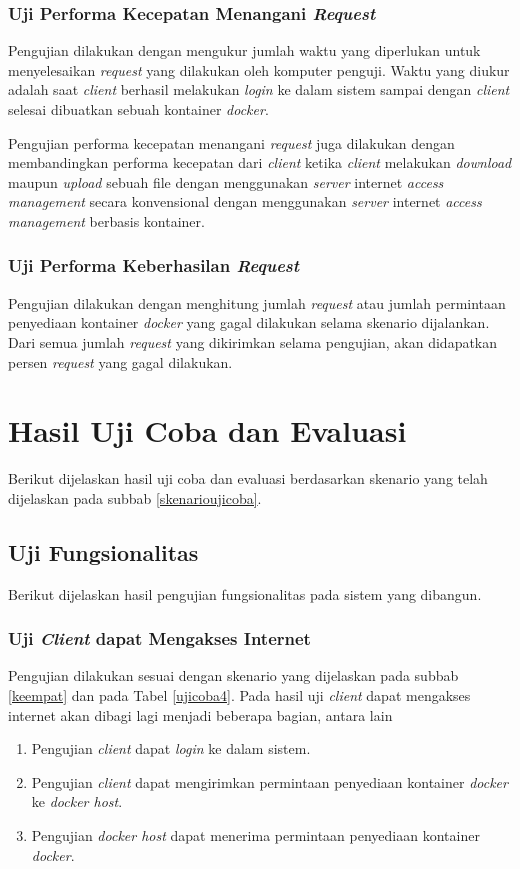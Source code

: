 \subsubsection{Uji Performa Kecepatan Menangani \textit{Request}}
Pengujian dilakukan dengan mengukur jumlah waktu yang diperlukan untuk menyelesaikan \textit{request} yang dilakukan oleh komputer penguji. Waktu yang diukur adalah saat \textit{client} berhasil melakukan \textit{login} ke dalam sistem sampai dengan \textit{client} selesai dibuatkan sebuah kontainer \textit{docker}.

Pengujian performa kecepatan menangani \textit{request} juga dilakukan dengan membandingkan performa kecepatan dari \textit{client} ketika \textit{client} melakukan \textit{download} maupun \textit{upload} sebuah file dengan menggunakan \textit{server} internet \textit{access management} secara konvensional dengan menggunakan \textit{server} internet \textit{access management} berbasis kontainer.

\subsubsection{Uji Performa Keberhasilan \textit{Request}}
Pengujian dilakukan dengan menghitung jumlah \textit{request} atau jumlah permintaan penyediaan kontainer \textit{docker} yang gagal dilakukan selama skenario dijalankan. Dari semua jumlah \textit{request} yang dikirimkan selama pengujian, akan didapatkan persen \textit{request} yang gagal dilakukan.
    
\section{Hasil Uji Coba dan Evaluasi}
Berikut dijelaskan hasil uji coba dan evaluasi berdasarkan skenario yang telah dijelaskan pada subbab \ref{skenarioujicoba}.
    
\subsection{Uji Fungsionalitas}
Berikut dijelaskan hasil pengujian fungsionalitas pada sistem yang dibangun.

\subsubsection{Uji \textit{Client} dapat Mengakses Internet}
Pengujian dilakukan sesuai dengan skenario yang dijelaskan pada subbab \ref{keempat} dan pada Tabel \ref{ujicoba4}. Pada hasil uji \textit{client} dapat mengakses internet akan dibagi lagi menjadi beberapa bagian, antara lain
\begin{enumerate}
\item Pengujian \textit{client} dapat \textit{login} ke dalam sistem.
\item Pengujian \textit{client} dapat mengirimkan permintaan penyediaan kontainer \textit{docker} ke \textit{docker host}.
\item Pengujian \textit{docker host} dapat menerima permintaan penyediaan kontainer \textit{docker}.
\end{enumerate}

